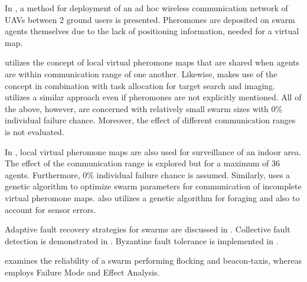\par In \parencite{hauert_ant-based_2008}, a method for deployment of an ad hoc wireless communication network of UAVs between 2 ground users is presented. Pheromones are deposited on swarm agents themselves due to the lack of positioning information, needed for a virtual map. 
\par \parencite{kuiper_mobility_2006} utilizes the concept of local virtual pheromone maps that are shared when agents are within communication range of one another. Likewise, \parencite{parunak_swarming_2003} makes use of the concept in combination with task allocation for target search and imaging. \parencite{pack_developing_2005} utilizes a similar approach even if pheromones are not explicitly mentioned. All of the above, however, are concerned with relatively small swarm sizes with 0\% individual failure chance. Moreover, the effect of different communication ranges is not evaluated.
\par In \parencite{tinoco_pherocom_2022}, local virtual pheromone maps are also used for surveillance of an indoor area. The effect of the communication range is explored but for a maximum of 36 agents. Furthermore, 0\% individual failure chance is assumed. Similarly, \parencite{nguyen_improving_2021} uses a genetic algorithm to optimize swarm parameters for communication of incomplete virtual pheromone maps. \parencite{hecker_beyond_2015} also utilizes a genetic algorithm for foraging and also to account for sensor errors.
\par Adaptive fault recovery strategies for swarms are discussed in \parencite{oladiran_fault_nodate}. Collective fault detection is demonstrated in \parencite{christensen_fireflies_2009}. Byzantine fault tolerance is implemented in \parencite{liao_uav_2021}.
\par \parencite{bjerknes_fault_2013} examines the reliability of a swarm performing flocking and beacon-taxis, whereas \parencite{winfield_safety_2006} employs Failure Mode and Effect Analysis.
